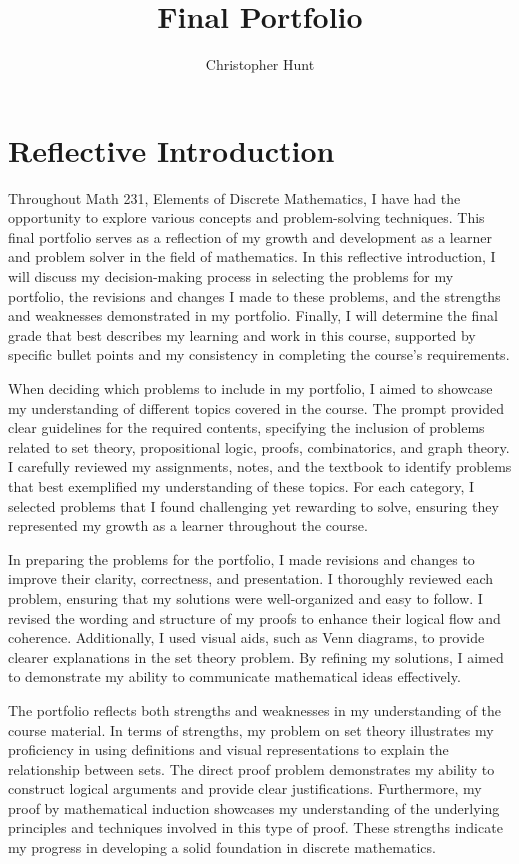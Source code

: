 \documentclass{article}
\title{Final Portfolio}
\author{Christopher Hunt}
\date{}
\begin{document}
\pagestyle{fancy}
\fancyhf{}
\rhead{\thepage}
\maketitle

\section*{Reflective Introduction}
Throughout Math 231, Elements of Discrete Mathematics, I have had the opportunity to explore various concepts and problem-solving techniques. This final portfolio serves as a reflection of my growth and development as a learner and problem solver in the field of mathematics. In this reflective introduction, I will discuss my decision-making process in selecting the problems for my portfolio, the revisions and changes I made to these problems, and the strengths and weaknesses demonstrated in my portfolio. Finally, I will determine the final grade that best describes my learning and work in this course, supported by specific bullet points and my consistency in completing the course's requirements.

When deciding which problems to include in my portfolio, I aimed to showcase my understanding of different topics covered in the course. The prompt provided clear guidelines for the required contents, specifying the inclusion of problems related to set theory, propositional logic, proofs, combinatorics, and graph theory. I carefully reviewed my assignments, notes, and the textbook to identify problems that best exemplified my understanding of these topics. For each category, I selected problems that I found challenging yet rewarding to solve, ensuring they represented my growth as a learner throughout the course.

In preparing the problems for the portfolio, I made revisions and changes to improve their clarity, correctness, and presentation. I thoroughly reviewed each problem, ensuring that my solutions were well-organized and easy to follow. I revised the wording and structure of my proofs to enhance their logical flow and coherence. Additionally, I used visual aids, such as Venn diagrams, to provide clearer explanations in the set theory problem. By refining my solutions, I aimed to demonstrate my ability to communicate mathematical ideas effectively.

The portfolio reflects both strengths and weaknesses in my understanding of the course material. In terms of strengths, my problem on set theory illustrates my proficiency in using definitions and visual representations to explain the relationship between sets. The direct proof problem demonstrates my ability to construct logical arguments and provide clear justifications. Furthermore, my proof by mathematical induction showcases my understanding of the underlying principles and techniques involved in this type of proof. These strengths indicate my progress in developing a solid foundation in discrete mathematics.
\end{document}
